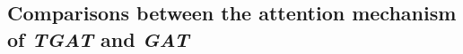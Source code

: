 \documentclass{article} %
\newcommand{\zbf}{\mathbf{z}}
\newcommand{\Zbf}{\mathbf{Z}}
\newcommand{\xbf}{\mathbf{x}}
\newcommand{\Vcal}{\mathcal{V}}
\begin{document}


\subsection{Comparisons between the attention mechanism of \textsl{TGAT} and \textsl{GAT}}
\end{document}
